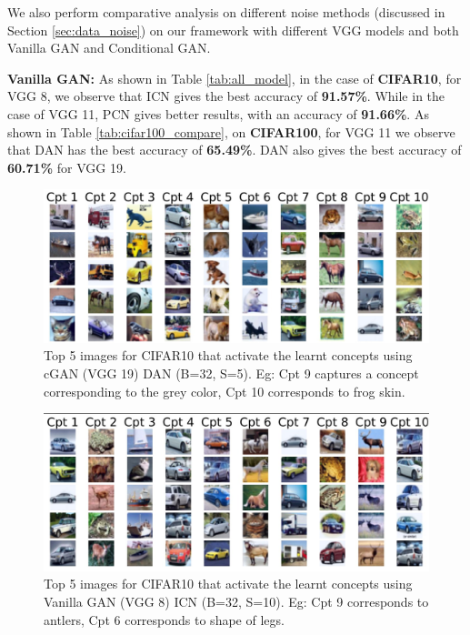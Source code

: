 \documentclass[letterpaper]{article}
\begin{document}
We also perform comparative analysis on different noise methods (discussed in Section \ref{sec:data_noise}) on our framework with different VGG models and both Vanilla GAN and Conditional GAN.

\textbf{Vanilla GAN:}\label{sec:van_gan}
As shown in Table \ref{tab:all_model}, in the case of \textbf{CIFAR10}, for VGG 8, we observe that ICN  gives the best accuracy of \textbf{91.57\%}. While in the case of VGG 11, PCN  gives better results, with an accuracy of \textbf{91.66\%}.
As shown in Table \ref{tab:cifar100_compare}, on \textbf{CIFAR100}, for VGG 11 we observe that DAN  has the best accuracy of \textbf{65.49\%}. DAN  also gives the best accuracy of \textbf{60.71\%} for VGG 19.



\begin{figure}[h!]
    \centering
    \includegraphics[width=1.0\columnwidth]{images/cgan19.jpg}
    \caption{Top 5 images for CIFAR10 that activate the learnt concepts using cGAN (VGG 19) DAN (B=32, S=5). Eg: Cpt 9 captures a concept corresponding to the grey color, Cpt 10 corresponds to frog skin.}
    \label{fig:cgan19}
\end{figure}

\begin{figure}[h!]
    \centering
    \includegraphics[width=1.0\columnwidth]{images/vcan8.jpg}
    \caption{Top 5 images for CIFAR10 that activate the learnt concepts using Vanilla GAN (VGG 8) ICN  (B=32, S=10). Eg: Cpt 9 corresponds to antlers, Cpt 6 corresponds to shape of legs.}
    \label{fig:vgan8}
\end{figure}
\end{document}
